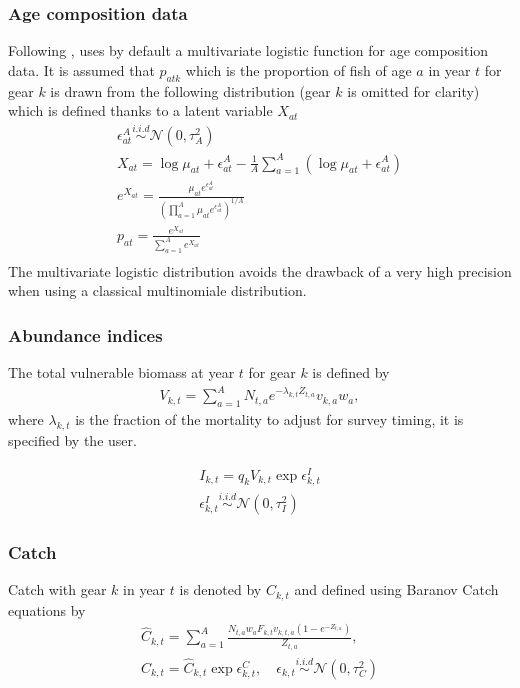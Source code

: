 \subsubsection{Age composition data}

Following  \cite{Schnute+95}, \iscam  uses by  default a  multivariate
logistic  function  for  age  composition data.  It  is  assumed  that
$p_{atk}$ which is the  proportion of fish of age $a$  in year $t$ for
gear $k$ is drawn from the following distribution (gear $k$ is omitted
for clarity) which is defined thanks to a latent variable $X_{at}$
\begin{gather}
\epsilon^{A}_{at} \overset{i.i.d}{\sim} \mathcal{N}(0,\tau^2_A)\nonumber \\ 
X_{at}       =       \log{\mu_{at}}       +       \epsilon_{at}^A       -
\frac{1}{A}\sum_{a=1}^A\left(\log{\mu_{at}} + \epsilon_{at}^A \right) \nonumber \\
e^{X_{at}} = \frac{\mu_{at}e^{\epsilon_{at}^A}}{ \left(\prod_{a=1}^A \mu_{at}e^{\epsilon_{at}^A}\right) ^{1/A}}\nonumber\\
p_{at} = \frac{e^{X_{at}} } {\sum_{a=1}^A e^{X_{at}} }\\
\end{gather}
The multivariate logistic distribution  avoids the drawback of a very high
precision when using a classical multinomiale distribution.

\subsubsection{Abundance indices}
The total vulnerable biomass at year $t$ for gear $k$ is defined by
\begin{gather}
V_{k,t}=\sum_{a=1}^A N_{t,a} e^{-\lambda_{k,t} Z_{t,a}} v_{k,a} w_a,
\end{gather}
 where $\lambda_{k,t}$ is the fraction  of the mortality to adjust for
 survey timing, it is specified by the user.

 
\begin{gather}
I_{k,t} = q_k V_{k,t} \exp{\epsilon_{k,t}^I}\\
\epsilon_{k,t}^I \overset{i.i.d}{\sim} \mathcal{N}(0,\tau_I^2)\nonumber
\end{gather}
\subsubsection{Catch}
Catch  with  gear  $k$  in  year  $t$  is  denoted  by  $C_{k,t}$  and
defined using Baranov Catch equations by
\begin{gather}
\hat{C}_{k,t}   =   \sum_{a=1}^A   \frac{N_{t,a}   w_a   F_{k,t}   v_{k,t,a}
  (1-e^{-Z_{t,a}}) }{Z_{t,a}},\\
C_{k,t} = \hat{C}_{k,t} \exp{\epsilon_{k,t}^C}, \quad \epsilon_{k,t}\overset{i.i.d}{\sim}\mathcal{N}(0, \tau^2_C)\nonumber
\end{gather}

